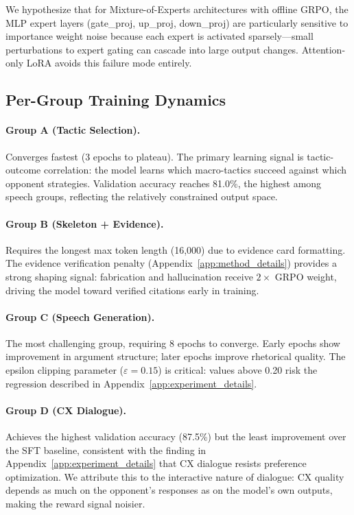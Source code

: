 We hypothesize that for Mixture-of-Experts architectures with offline
GRPO, the MLP expert layers (gate\_proj, up\_proj, down\_proj) are
particularly sensitive to importance weight noise because each expert
is activated sparsely---small perturbations to expert gating can
cascade into large output changes. Attention-only LoRA avoids this
failure mode entirely.

\subsection{Per-Group Training Dynamics}

\paragraph{Group A (Tactic Selection).}
Converges fastest (3 epochs to plateau). The primary learning signal is
tactic-outcome correlation: the model learns which macro-tactics succeed
against which opponent strategies. Validation accuracy reaches 81.0\%,
the highest among speech groups, reflecting the relatively constrained
output space.

\paragraph{Group B (Skeleton + Evidence).}
Requires the longest max token length (16,000) due to evidence card
formatting. The evidence verification penalty (Appendix~\ref{app:method_details})
provides a strong shaping signal: fabrication and hallucination receive
$2\times$ GRPO weight, driving the model toward verified citations early
in training.

\paragraph{Group C (Speech Generation).}
The most challenging group, requiring 8 epochs to converge. Early epochs
show improvement in argument structure; later epochs improve rhetorical
quality. The epsilon clipping parameter ($\varepsilon = 0.15$) is critical:
values above 0.20 risk the regression described in
Appendix~\ref{app:experiment_details}.

\paragraph{Group D (CX Dialogue).}
Achieves the highest validation accuracy (87.5\%) but the least
improvement over the SFT baseline, consistent with the finding in
Appendix~\ref{app:experiment_details} that CX dialogue resists
preference optimization. We attribute this to the interactive nature
of dialogue: CX quality depends as much on the opponent's responses
as on the model's own outputs, making the reward signal noisier.

